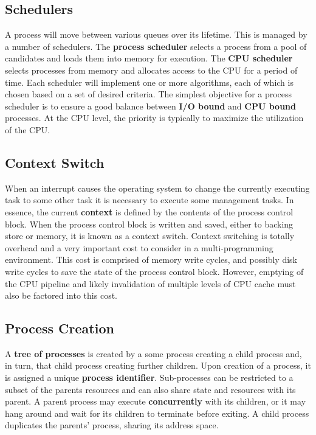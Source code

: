 \documentclass[10pt,a4paper]{article}
\begin{document}
\subsection{Schedulers}
A process will move between various queues over its lifetime. This is managed by a number of schedulers. The {\bf process scheduler} selects a process from a pool of candidates and loads them into memory for execution. The {\bf CPU scheduler} selects processes from memory and allocates access to the CPU for a period of time. Each scheduler will implement one or more algorithms, each of which is chosen based on a set of desired criteria. The simplest objective for a process scheduler is to ensure a good balance between {\bf I/O bound} and {\bf CPU bound} processes. At the CPU level, the priority is typically to maximize the utilization of the CPU. 
\subsection{Context Switch}
When an interrupt causes the operating system to change the currently executing task to some other task it is necessary to execute some management tasks. In essence, the current {\bf context} is defined by the contents of the process control block. When the process control block is written and saved, either to backing store or memory, it is known as a context switch. Context switching is totally overhead and a very important cost to consider in a multi-programming environment. This cost is comprised of memory write cycles, and possibly disk write cycles to save the state of the process control block. However, emptying of the CPU pipeline and likely invalidation of multiple levels of CPU cache must also be factored into this cost. 
\subsection{Process Creation}
A {\bf tree of processes} is created by a some process creating a child process and, in turn, that child process creating further children. Upon creation of a process, it is assigned a unique {\bf process identifier}. Sub-processes can be restricted to a subset of the parents resources and can also share state and resources with its parent. A parent process may execute {\bf concurrently} with its children, or it may hang around and wait for its children to terminate before exiting. A child process duplicates the parents' process, sharing its address space. 
\end{document}
